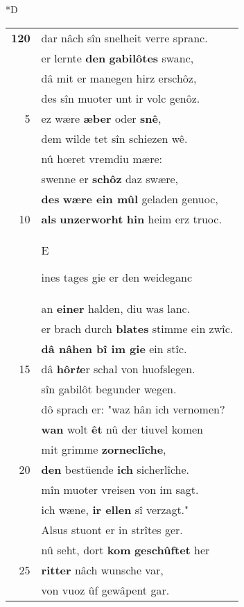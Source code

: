 \documentclass[8pt,a4paper,notitlepage]{article}
\begin{document}
\begin{table}[ht]
\begin{minipage}[t]{0.5\linewidth}
\small
\begin{center}*D
\end{center}
\begin{tabular}{rl}
\textbf{120} & dar nâch sîn snelheit verre spranc.\\ 
 & er lernte \textbf{den} \textbf{gabilôtes} swanc,\\ 
 & dâ mit er manegen hirz erschôz,\\ 
 & des sîn muoter unt ir volc genôz.\\ 
5 & ez wære \textbf{æber} oder \textbf{snê},\\ 
 & dem wilde tet sîn schiezen wê.\\ 
 & nû hœret vremdiu mære:\\ 
 & swenne er \textbf{schôz} daz swære,\\ 
 & \textbf{des} \textbf{wære ein mûl} geladen genuoc,\\ 
10 & \textbf{als} \textbf{unzerworht} \textbf{hin} heim erz truoc.\\ 
 & \begin{large}E\end{large}ines tages gie er den weideganc\\ 
 & an \textbf{einer} halden, diu was lanc.\\ 
 & er brach durch \textbf{blates} stimme ein zwîc.\\ 
 & \textbf{dâ nâhen bî im gie} ein stîc.\\ 
15 & dâ \textbf{hôr\textit{t}e}r schal von huofslegen.\\ 
 & sîn gabilôt begunder wegen.\\ 
 & dô sprach er: "waz hân ich vernomen?\\ 
 & \textbf{wan} wolt \textbf{êt} nû der tiuvel komen\\ 
 & mit grimme \textbf{zorneclîche},\\ 
20 & \textbf{den} bestüende \textbf{ich} sicherlîche.\\ 
 & mîn muoter vreisen von im sagt.\\ 
 & ich wæne, \textbf{ir ellen} sî verzagt."\\ 
 & Alsus stuont er in strîtes ger.\\ 
 & nû seht, dort \textbf{kom} \textbf{geschûftet} her\\ 
25 & \textbf{ritter} nâch wunsche var,\\ 
 & von vuoz ûf gewâpent gar.\\ 

\end{tabular}
\end{minipage}
\end{table}
\end{document}
